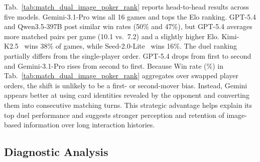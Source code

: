 Tab.~\ref{tab:match_dual_image_poker_rank} reports head-to-head results across five models. Gemini-3.1-Pro wins all 16 games and tops the Elo ranking. GPT-5.4 and Qwen3.5-397B post similar win rates (50\% and 47\%), but GPT-5.4 averages more matched pairs per game (10.1 vs.\ 7.2) and a slightly higher Elo. Kimi-K2.5~\citep{team2026kimi} wins 38\% of games, while Seed-2.0-Lite~\citep{seed2_lite} wins 16\%.
%
The duel ranking partially differs from the single-player order. GPT-5.4 drops from first to second and Gemini-3.1-Pro rises from second to first. Because Win rate (\%) in Tab.~\ref{tab:match_dual_image_poker_rank} aggregates over swapped player orders, the shift is unlikely to be a first- or second-mover bias. Instead, Gemini appears better at using card identities revealed by the opponent and converting them into consecutive matching turns. This strategic advantage helps explain its top duel performance and suggests stronger perception and retention of image-based information over long interaction histories.



\subsection{Diagnostic Analysis}
\label{sec:diagnostic_analysis}





